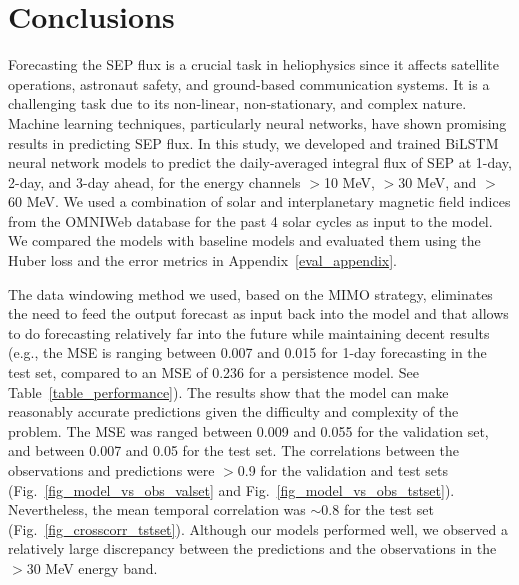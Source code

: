 \section{Conclusions}
\label{sec_ch4_conclusion}
Forecasting the SEP flux is a crucial task in heliophysics since it affects satellite operations, astronaut safety, and ground-based communication systems. It is a challenging task due to its non-linear, non-stationary, and complex nature. Machine learning techniques, particularly neural networks, have shown promising results in predicting SEP flux.
In this study, we developed and trained BiLSTM neural network models to predict the daily-averaged integral flux of SEP at 1-day, 2-day, and 3-day ahead, for the energy channels $>$10 MeV, $>$30 MeV, and $>$60 MeV.
We used a combination of solar and interplanetary magnetic field indices from the OMNIWeb database for the past 4 solar cycles as input to the model.
We compared the models with baseline models and evaluated them using the Huber loss and the error metrics in Appendix~\ref{eval_appendix}.

The data windowing method we used, based on the MIMO strategy, eliminates the need to feed the output forecast as input back into the model and that allows to do forecasting relatively far into the future while maintaining decent results (e.g., the MSE is ranging between 0.007 and 0.015 for 1-day forecasting in the test set, compared to an MSE of 0.236 for a persistence model. See Table~\ref{table_performance}).
The results show that the model can make reasonably accurate predictions given the difficulty and complexity of the problem.
The MSE was ranged between 0.009 and 0.055 for the validation set, and between 0.007 and 0.05 for the test set.
The correlations between the observations and predictions were $>$0.9 for the validation and test sets (Fig.~\ref{fig_model_vs_obs_valset} and Fig.~\ref{fig_model_vs_obs_tstset}).
Nevertheless, the mean temporal correlation was $\sim$0.8 for the test set (Fig.~\ref{fig_crosscorr_tstset}).
Although our models performed well, we observed a relatively large discrepancy between the predictions and the observations in the $>$30 MeV energy band.


